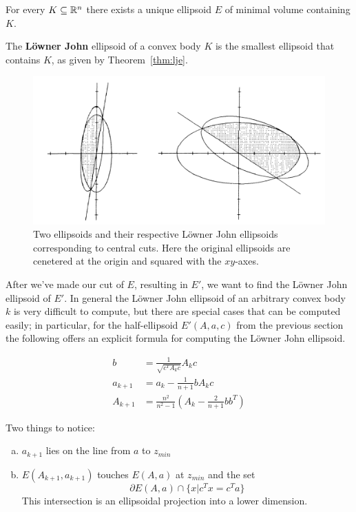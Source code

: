 \begin{theorem} \label{thm:lje}
  For every \(K \subseteq \mathbb R^n\) there exists a unique ellipsoid \(E\) of
  minimal volume containing \(K\).
\end{theorem}


\begin{defbox}
\begin{definition}
    The \textbf{L\"owner John} ellipsoid of a convex body \(K\) is the smallest
    ellipsoid that contains \(K\), as given by Theorem~\ref{thm:lje}.
\end{definition}

\end{defbox}

\begin{figure}[h]
  \centering
  \includegraphics[width=\textwidth]{img/lje}
  \caption{Two ellipsoids and their respective L\"owner John ellipsoids
  corresponding to central cuts. Here the original ellipsoids are cenetered at
  the origin and squared with the \(xy\)-axes.}
  \label{fig:lje}
\end{figure}

After we've made our cut of \(E\), resulting in \(E'\), we want to find the
L\"owner John ellipsoid of \(E'\). In general the L\"owner John ellipsoid of an
arbitrary convex body \(k\) is very difficult to compute, but there are special
cases that can be computed easily; in particular, for the half-ellipsoid
\(E'(A, a, c)\) from the previous section the following offers an explicit
formula for computing the L\"owner John ellipsoid.

\begin{align*}
  b &= \frac{1}{\sqrt{c^T A_k c}} A_k c\\
  a_{k+1} &= a_k - \frac{1}{n+1} b A_k c\\
  A_{k+1} &= \frac{n^2}{n^2-1}\left(A_k - \frac{2}{n+1}bb^T\right)
\end{align*}

Two things to notice:
\begin{enumerate}[(a)]
  \item \(a_{k+1}\) lies on the line from \(a\) to \(z_{min}\)
  \item \(E(A_{k+1}, a_{k+1})\) touches \(E(A,a)\) at \(z_{min}\) and the set 
    \[\partial E(A,a) \cap \{x | c^T x = c^T a\}\]
    This intersection is an ellipsoidal projection into a lower dimension.
\end{enumerate}
